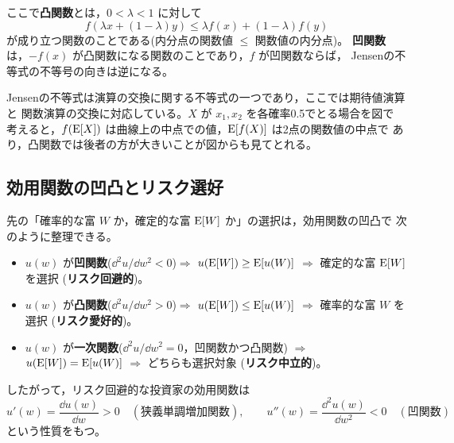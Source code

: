 ここで\textbf{凸関数}とは，$0 < \lambda < 1$ に対して
\begin{equation}
f(\lambda x + (1-\lambda)y) \leq \lambda f(x) + (1-\lambda) f(y)
\end{equation}
が成り立つ関数のことである(内分点の関数値 $\leq$ 関数値の内分点)。
\textbf{凹関数}は，$-f(x)$ が凸関数になる関数のことであり，$f$ が凹関数ならば，
Jensenの不等式の不等号の向きは逆になる。

Jensenの不等式は演算の交換に関する不等式の一つであり，ここでは期待値演算と
関数演算の交換に対応している。$X$ が $x_1, x_2$ を各確率0.5でとる場合を図で
考えると，$f(\mathrm{E}[X])$ は曲線上の中点での値，$\mathrm{E}[f(X)]$ は2点の関数値の中点で
あり，凸関数では後者の方が大きいことが図からも見てとれる。

\subsection{効用関数の凹凸とリスク選好}

先の「確率的な富 $W$ か，確定的な富 $\mathrm{E}[W]$ か」の選択は，効用関数の凹凸で
次のように整理できる。

\begin{keypoint}[効用関数の凹凸とリスク選好]
\begin{itemize}
\item $u(w)$ が\textbf{凹関数}($\dd^2u/\dd w^2 < 0$)$\Rightarrow$
$u(\mathrm{E}[W]) \geq \mathrm{E}[u(W)]$ $\Rightarrow$ 確定的な富 $\mathrm{E}[W]$ を選択
(\textbf{リスク回避的})。
\item $u(w)$ が\textbf{凸関数}($\dd^2u/\dd w^2 > 0$)$\Rightarrow$
$u(\mathrm{E}[W]) \leq \mathrm{E}[u(W)]$ $\Rightarrow$ 確率的な富 $W$ を選択
(\textbf{リスク愛好的})。
\item $u(w)$ が\textbf{一次関数}($\dd^2u/\dd w^2 = 0$，凹関数かつ凸関数)
$\Rightarrow$ $u(\mathrm{E}[W]) = \mathrm{E}[u(W)]$ $\Rightarrow$ どちらも選択対象
(\textbf{リスク中立的})。
\end{itemize}
\end{keypoint}

したがって，リスク回避的な投資家の効用関数は
\begin{equation}
u'(w) = \frac{\dd u(w)}{\dd w} > 0 \quad(\text{狭義単調増加関数}),
\qquad
u''(w) = \frac{\dd^2 u(w)}{\dd w^2} < 0 \quad(\text{凹関数})
\end{equation}
という性質をもつ。

